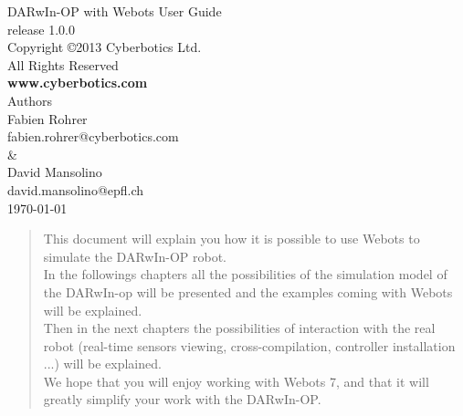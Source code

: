 \documentclass[a4paper, 12pt]{article}  		%
\begin{document}
\begin{center}
\vspace{5cm}
\Huge{DARwIn-OP with Webots User Guide}\\
\vspace{0.5cm}
\normalsize{release 1.0.0}\\

\vspace{3cm}
\LARGE{Copyright \copyright 2013 Cyberbotics Ltd.}\\
\vspace{0.5cm}
\large{All Rights Reserved}\\

\vspace{2cm}
\normalsize{\textbf{www.cyberbotics.com}}\\

\vspace{4cm}
\LARGE{Authors}\\
\vspace{0.5cm}
\normalsize{Fabien Rohrer}\\
\small{fabien.rohrer@cyberbotics.com}\\
\vspace{0.2cm}
\normalsize{\&}\\
\vspace{0.2cm}
\normalsize{David Mansolino}\\
\small{david.mansolino@epfl.ch}\\

\vspace{4cm}
\Large{\today}

\end{center}

\newpage
\thispagestyle{empty}
\setcounter{page}{0}

\renewcommand{\abstractname}{\huge{Foreword}}
\begin{abstract}
\vspace{3cm}
This document will explain you how it is possible to use Webots to simulate the DARwIn-OP robot.\\

In the followings chapters all the possibilities of the simulation model of the DARwIn-op will be presented and the examples coming with Webots will be explained.\\

Then in the next chapters the possibilities of interaction with the real robot (real-time sensors viewing, cross-compilation, controller installation ...) will be explained.\\

We hope that you will enjoy working with Webots 7, and that it will greatly simplify your work with the DARwIn-OP.\\


\end{abstract}
\end{document}
